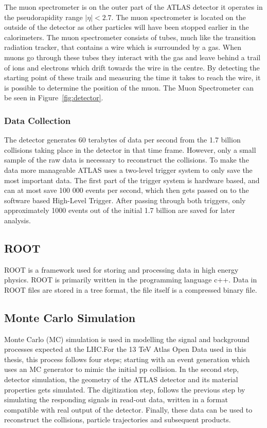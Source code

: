 \documentclass[12pt,a4paper]{article}
\numberwithin{equation}{section}
\begin{document}
The muon spectrometer is on the outer part of the ATLAS detector it operates in
the pseudorapidity range $|\eta| < 2.7$. The muon spectrometer is
located on the outside of the detector as other particles will have been stopped earlier in the calorimeters. The muon spectrometer consists of tubes, much like the transition
radiation tracker, that contains a wire which is surrounded by a gas. When
muons go through these tubes they interact with the gas and leave behind a trail
of ions and electrons which drift towards the wire in the centre. By
detecting the starting point of these trails and measuring the time it takes to
reach the wire, it is possible to determine the position of the muon. The
Muon Spectrometer can be seen in Figure~\ref{fig:detector}. \cite{ATLAS-Muon}


\subsubsection{Data Collection}
The detector generates 60 terabytes of data per second from the 1.7 billion
collisions taking place in the detector in that time frame. However, only a
small sample of the raw data is necessary to reconstruct the collisions. To make
the data more manageable ATLAS uses a two-level trigger system to only save the
most important data. The first part of the trigger system is hardware based, and
can at most save 100 000 events per second, which then gets passed on to the
software based High-Level Trigger. After passing through both triggers, only
approximately 1000 events out of the initial 1.7 billion are saved for later
analysis.\cite{ATLAS-trig}



\subsection{ROOT}
ROOT is a framework used for storing and processing data in high energy physics.
ROOT is primarily written in the programming language c++. Data in ROOT files
are stored in a tree format, the file itself is a compressed binary
file.\cite{root}


\subsection{Monte Carlo Simulation}
Monte Carlo (MC) simulation is used in modelling the signal and background
processes expected at the LHC.\@ For the 13 TeV Atlas Open Data used in this
thesis, this process follows four steps; starting with an event generation which
uses an MC generator to mimic the initial pp collision. In the second step,
detector simulation, the geometry of the ATLAS detector and its material
properties gets simulated. The digitization step, follows the previous step by
simulating the responding signals in read-out data, written in a format
compatible with real output of the detector. Finally, these data can be used to
reconstruct the collisions, particle trajectories and subsequent
products.\\
\end{document}
